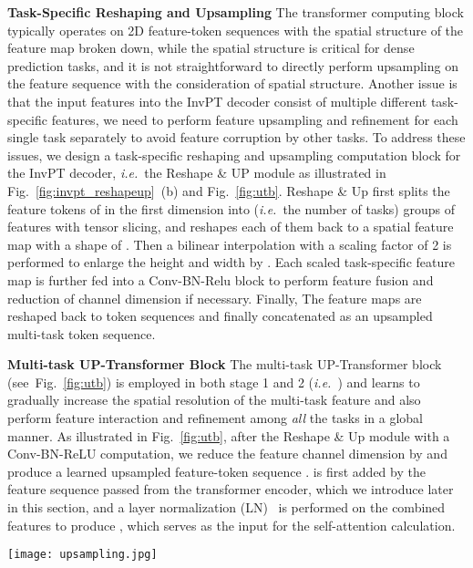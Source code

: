\documentclass[runningheads]{llncs}
\newcommand*{\ie}{\emph{i.e.}}
\begin{document}
\vspace{3pt}
\par\noindent\textbf{Task-Specific Reshaping and Upsampling} The transformer computing block typically operates on 2D feature-token sequences with the spatial structure of the feature map broken down, while the spatial structure is critical for dense prediction tasks, and it is not straightforward to directly perform upsampling on the feature sequence with the consideration of spatial structure. Another issue is that the input features into the InvPT decoder consist of multiple different task-specific features, we need to perform feature upsampling and refinement for each single task separately to avoid feature corruption by other tasks. To address these issues, we design a task-specific reshaping and upsampling computation block for the InvPT decoder, \ie~the Reshape \& UP module as illustrated in Fig.~\ref{fig:invpt_reshapeup}~(b) and Fig.~\ref{fig:utb}. {Reshape \& Up} first splits the feature tokens of  in the first dimension into  (\ie~the number of tasks) groups of features with tensor slicing, and reshapes each of them back to a spatial feature map with a shape of . Then a bilinear interpolation with a scaling factor of 2 is performed to enlarge the height and width by . Each scaled task-specific feature map is further fed into a Conv-BN-Relu block to perform feature fusion and reduction of channel dimension if necessary. Finally, The  feature maps are reshaped back to token sequences and finally concatenated as an upsampled multi-task token sequence.
\vspace{3pt}
\par\noindent\textbf{Multi-task UP-Transformer Block} The multi-task UP-Transformer block (see~Fig.~\ref{fig:utb}) is employed in both stage 1 and 2 (\ie~) and learns to gradually increase the spatial resolution of the multi-task feature and also perform feature interaction and refinement among \emph{all} the tasks in a global manner. As illustrated in Fig.~\ref{fig:utb},
after the Reshape \& Up module with a  Conv-BN-ReLU computation, we reduce the feature channel dimension by  and produce a
learned upsampled feature-token sequence .  is first added by the feature sequence passed from the transformer encoder, which we introduce later in this section, and a layer normalization (LN)~\cite{layernorm} is performed on the combined features to produce , which serves as the input for the self-attention calculation.

\begin{figure*}[t]
\vspace{-10pt}

	\centering
	\texttt{[image: upsampling.jpg]}
	\vspace{-15pt}
	\caption{Illustration of the proposed UP-Transformer Block. \textbf{Input}:  is the attention score matrix of the -th stage,  is the input multi-task feature sequence of the -th stage, and  is the feature passed from the transformer encoder. \textbf{Output}:  is the enhanced attention score matrix passing to the next stage and  is the refined and upsampled feature sequence.
}
\vspace{-12pt}
	\label{fig:utb}
\end{figure*}
\end{document}
